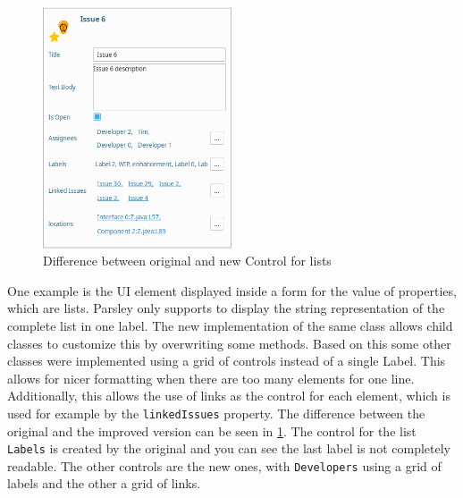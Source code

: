 \begin{figure}[!h]
	\centering
	\includegraphics[width=0.5\textwidth]{graphics/screenshot_improvement_fromControl.png}
	\caption{Difference between original and new Control for lists}
	\label{fig:c4:screenshot_improvement_formControl}
\end{figure}
One example is the \gls{UI} element displayed inside a form for the value of properties, which are lists.
Parsley only supports to display the string representation of the complete list in one label.
The new implementation of the same class allows child classes to customize this by overwriting some methods.
Based on this some other classes were implemented using a grid of controls instead of a single Label.
This allows for nicer formatting when there are too many elements for one line.
Additionally, this allows the use of links as the control for each element, which is used for example by the \lstinline|linkedIssues| property.
The difference between the original and the improved version can be seen in \cref{fig:c4:screenshot_improvement_formControl}.
The control for the list \lstinline|Labels| is created by the original and you can see the last label is not completely readable.
The other controls are the new ones, with \lstinline|Developers| using a grid of labels and the other a grid of links.

